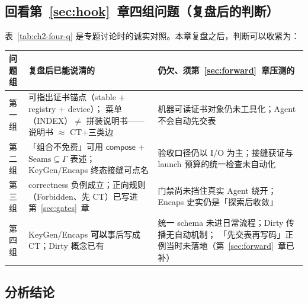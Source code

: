 \documentclass[UTF8,a4paper,11pt]{ctexart}
\theoremstyle{definition}
\theoremstyle{plain}
\theoremstyle{remark}
\numberwithin{figure}{section}
\numberwithin{table}{section}
\begin{document}
\subsection{回看第~\ref{sec:hook}~章四组问题（复盘后的判断）}
\label{sec:replay-four-q}

表~\ref{tab:ch2-four-q} 是专题讨论时的诚实对照。本章复盘之后，判断可以收紧为：

\begin{center}
\small
\begin{tabular}{@{}L{2.2cm}L{5.8cm}L{5.8cm}@{}}
  \toprule
  问题组 & 复盘后\textbf{已能}说清的 & \textbf{仍欠}、须第~\ref{sec:forward}~章压测的 \\
  \midrule
  第一组 &
  可指出证书锚点（stable + registry + device）；
  菜单（INDEX）$\neq$ 拼装说明书——说明书 $\approx$ $\mathrm{CT}$+三类边 &
  机器可读证书对象仍未工具化；Agent 不会自动先交表 \\
  第二组 &
  「组合不免费」可用 $\mathsf{compose}$ + $\mathrm{Seams}\subseteq\Gamma$ 表述；
  KeyGen/Encaps 终态接缝可点名 &
  验收口径仍以 I/O 为主；接缝获证与 launch 预算的统一检查未自动化 \\
  第三组 &
  correctness 负例成立；正向规则（Forbidden、先 CT）已写进第~\ref{sec:gates}~章 &
  门禁尚未挡住真实 Agent 绕开；Encaps 史实仍是「探索后收敛」 \\
  第四组 &
  KeyGen/Encaps \textbf{可以}事后写成 $\mathrm{CT}$；Dirty 概念已有 &
  统一 schema 未进日常流程；Dirty 传播无自动机制；
  「先交表再写码」正例当时未落地（第~\ref{sec:forward}~章已补） \\
  \bottomrule
\end{tabular}
\end{center}

\subsection{分析结论}
\label{sec:replay-verdict}
\end{document}
